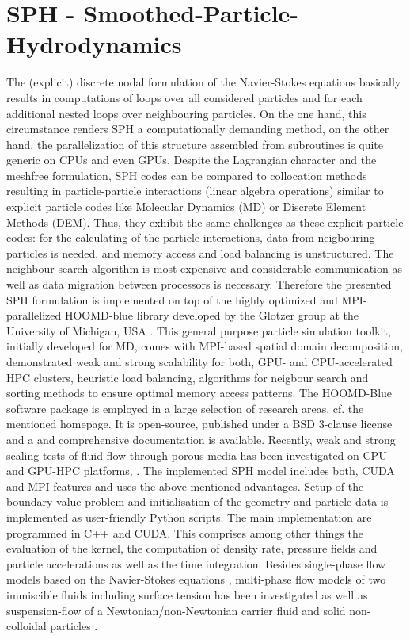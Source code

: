 \section{SPH - Smoothed-Particle-Hydrodynamics}
The (explicit) discrete nodal formulation of the Navier-Stokes equations basically results in computations of loops over all considered particles and for each additional nested loops over neighbouring particles. On the one hand, this circumstance renders SPH a computationally demanding method, on the other hand, the parallelization of this structure assembled from subroutines is quite generic on CPUs and even GPUs. 
Despite the Lagrangian character and the meshfree formulation, SPH codes can be compared to collocation methods resulting
in particle-particle interactions (linear algebra operations)
similar to explicit particle codes like Molecular Dynamics (MD)
or Discrete Element Methods (DEM).
Thus, they exhibit the same challenges as these explicit particle codes: for the calculating of the particle interactions, data from neigbouring particles is needed, and memory access and load balancing is unstructured. The neighbour search algorithm is most expensive and considerable communication as well as data migration between processors is necessary.
Therefore the presented SPH formulation is implemented on top of the highly optimized and MPI-parallelized HOOMD-blue library developed by the Glotzer group at the University of Michigan, USA
\cite{anderson2008general, glaser2015strong}
. 
This general purpose particle simulation toolkit, initially developed for MD, comes with MPI-based spatial domain decomposition, demonstrated weak and strong scalability for both, GPU- and CPU-accelerated HPC clusters, heuristic load balancing, algorithms for neigbour search and sorting methods to ensure optimal memory access patterns. 
The HOOMD-Blue software package is employed in a large selection of research areas, cf. the mentioned homepage. It is open-source, published under a BSD 3-clause license and a and comprehensive documentation is available.
Recently, weak and strong scaling tests of fluid flow through porous media
has been investigated on CPU- and GPU-HPC platforms, 
\cite{osorno2019}.
The implemented SPH model \cite{sivanesapillai2016pore} includes both, CUDA and MPI features and uses the above mentioned advantages. Setup of the boundary value problem and initialisation of the geometry and particle data is implemented as user-friendly Python scripts. The main implementation are programmed in C++ and CUDA. This comprises among other things the evaluation of the kernel, the computation of density rate, pressure fields and particle accelerations as well as the time integration. Besides single-phase flow models based on the Navier-Stokes equations \cite{sivanesapillai2014transition}, multi-phase flow models of two immiscible fluids including surface tension has been investigated \cite{sivanesapillai2016csf} as well as 
suspension-flow of a Newtonian/non-Newtonian carrier fluid and solid non-colloidal particles \cite{markauskas2017comparative}.